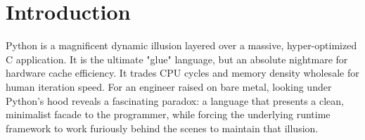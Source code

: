 \chapter{Introduction}

Python is a magnificent dynamic illusion layered over a massive, hyper-optimized C application. It is the ultimate "glue" language, but an absolute nightmare for hardware cache efficiency. It trades CPU cycles and memory density wholesale for human iteration speed. For an engineer raised on bare metal, looking under Python's hood reveals a fascinating paradox: a language that presents a clean, minimalist facade to the programmer, while forcing the underlying runtime framework to work furiously behind the scenes to maintain that illusion.